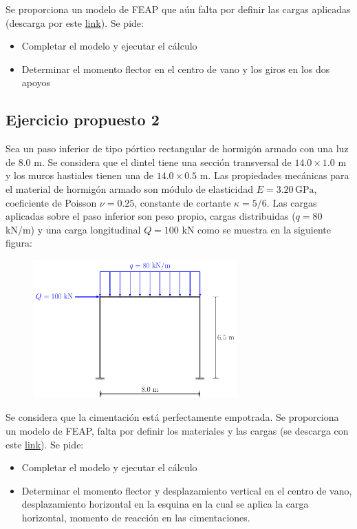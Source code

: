 \documentclass[a4paper,12pt]{article}
\begin{document}
Se proporciona un modelo de FEAP que aún falta por definir las cargas aplicadas (descarga por este \href{http://stokes.mecanica.upm.es/MEFL_open/talleres/I1v2d-eb}{link}). Se pide:
\begin{itemize}
\item Completar el modelo y ejecutar el cálculo
\item Determinar el momento flector en el centro de vano y los giros en los dos apoyos
\end{itemize}

\clearpage

\subsection*{Ejercicio propuesto 2}
Sea un paso inferior de tipo pórtico rectangular de hormigón armado con una luz de 8.0 m. Se considera que el dintel tiene una sección transversal de $14.0\times1.0$ m y los muros hastiales tienen una de $14.0\times0.5$ m. Las propiedades mecánicas para el material de hormigón armado son módulo de elasticidad $E=3.20\,\text{GPa}$,  coeficiente de Poisson $\nu=0.25$,  constante de cortante $\kappa=5/6$. 
Las cargas aplicadas sobre el paso inferior son peso propio, cargas distribuidas ($q=80$ kN/m) y una carga longitudinal $Q=100$ kN como se muestra en la siguiente figura:
\begin{figure}[h]
\centering
\includegraphics[width=0.7\textwidth]{figs/croquis2.pdf}
\end{figure}
Se considera que la cimentación está perfectamente empotrada. Se proporciona un modelo de FEAP, falta por definir los materiales y las cargas (se descarga con este \href{http://stokes.mecanica.upm.es/MEFL_open/talleres/Ip2d-eb}{link}). Se pide:

\begin{itemize}
\item Completar el modelo y ejecutar el cálculo
\item Determinar el momento flector y desplazamiento vertical en el centro de vano, desplazamiento horizontal en la esquina en la cual se aplica la carga horizontal, momento de reacción en las cimentaciones.
\end{itemize}
\end{document}
